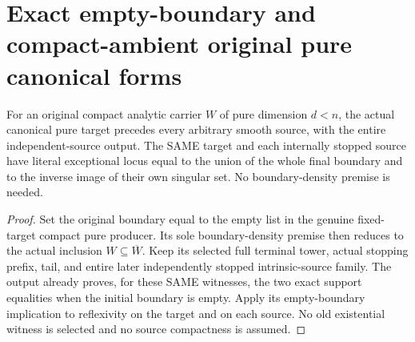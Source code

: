 \section{Exact empty-boundary and compact-ambient original pure canonical forms}

\begin{theorem}
\label{hir:original-pure-compact-empty-canonical-specialization}
\leanok
For an original compact analytic carrier $W$ of pure dimension $d<n$,
the actual canonical pure target precedes every arbitrary smooth
source, with the entire independent-source output. The SAME target
and each internally stopped source have literal exceptional locus
equal to the union of the whole final boundary and to the inverse
image of their own singular set. No boundary-density premise is needed.
\end{theorem}
\begin{proof}
Set the original boundary equal to the empty list in the genuine
fixed-target compact pure producer. Its sole boundary-density premise
then reduces to the actual inclusion $W\subseteq\overline W$.
Keep its selected full terminal tower, actual stopping prefix, tail,
and entire later independently stopped intrinsic-source family.
The output already proves, for these SAME witnesses, the two exact
support equalities when the initial boundary is empty. Apply its
empty-boundary implication to reflexivity on the target and on each
source. No old existential witness is selected and no source
compactness is assumed.
\end{proof}

